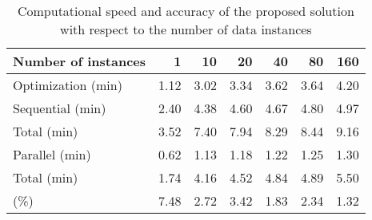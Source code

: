 \begin{table*}
  \centering
  \caption{
    Computational speed and accuracy of the proposed solution with respect to
    the number of data instances
  }
  \ttfamily
  \begin{tabular}{lrrrrrr}
    \toprule
    \textnormal{Number of instances} &    1 &   10 &   20 &   40 &   80 &  160 \\
    \midrule
    \textnormal{Optimization (min)}  & 1.12 & 3.02 & 3.34 & 3.62 & 3.64 & 4.20 \\
    \midrule
    \textnormal{Sequential (min)}    & 2.40 & 4.38 & 4.60 & 4.67 & 4.80 & 4.97 \\
    \textnormal{Total (min)}         & 3.52 & 7.40 & 7.94 & 8.29 & 8.44 & 9.16 \\
    \midrule
    \textnormal{Parallel (min)}      & 0.62 & 1.13 & 1.18 & 1.22 & 1.25 & 1.30 \\
    \textnormal{Total (min)}         & 1.74 & 4.16 & 4.52 & 4.84 & 4.89 & 5.50 \\
    \midrule
    \textnormal{\up{NRMSE} (\%)}     & 7.48 & 2.72 & 3.42 & 1.83 & 2.34 & 1.32 \\
    \bottomrule
  \end{tabular}
\end{table*}
